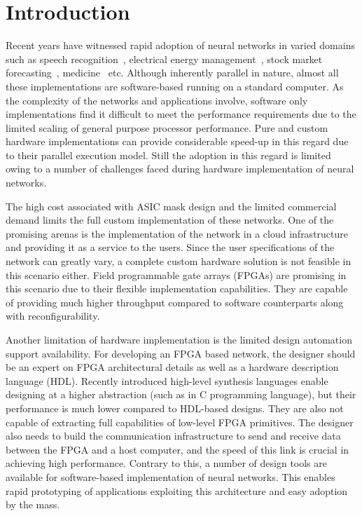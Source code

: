 \section{Introduction}
\label{sec_intro}

Recent years have witnessed rapid adoption of neural networks in varied domains such as speech recognition~\cite{Deng2013}, electrical energy management~\cite{Houria2015}, stock market forecasting~\cite{Ticknor2015}, medicine~\cite{Azar2013} etc. 
Although inherently parallel in nature, almost all these implementations are software-based running on a standard computer.
As the complexity of the networks and applications involve, software only implementations find it difficult to meet the performance requirements due to the limited scaling of general purpose processor performance.
Pure and custom hardware implementations can provide considerable speed-up in this regard due to their parallel execution model. 
Still the adoption in this regard is limited owing to a number of challenges faced during hardware implementation of neural networks.

The high cost associated with ASIC mask design and the limited commercial demand limits the full custom implementation of these networks.
One of the promising arenas is the implementation of the network in a cloud infrastructure~\cite{Yuan2014} and providing it as a service to the users.
Since the user specifications of the network can greatly vary, a complete custom hardware solution is not feasible in this scenario either.
Field programmable gate arrays (FPGAs) are promising in this scenario due to their flexible implementation capabilities.
They are capable of providing much higher throughput compared to software counterparts along with reconfigurability.

Another limitation of hardware implementation is the limited design automation support availability.
For developing an FPGA based network, the designer should be an expert on FPGA architectural details as well as a hardware description language (HDL).
Recently introduced high-level synthesis languages enable designing at a higher abstraction (such as in C programming language), but their performance is much lower compared to HDL-based designs.
They are also not capable of extracting full capabilities of low-level FPGA primitives.
The designer also needs to build the communication infrastructure to send and receive data between the FPGA and a host computer, and the speed of this link is crucial in achieving high performance.
Contrary to this, a number of design tools are available for software-based implementation of neural networks.
This enables rapid prototyping of applications exploiting this architecture and easy adoption by the mass.

